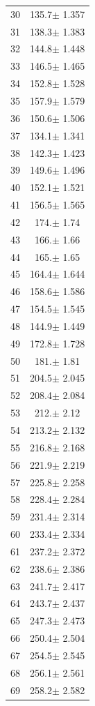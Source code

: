 \documentclass[a4paper]{instrumentacao}
\begin{document}
\begin{longtable}{cc}
 30 & 135.7$\pm$ 1.357 \\
 31 & 138.3$\pm$ 1.383 \\
 32 & 144.8$\pm$ 1.448 \\
 33 & 146.5$\pm$ 1.465 \\
 34 & 152.8$\pm$ 1.528 \\
 35 & 157.9$\pm$ 1.579 \\
 36 & 150.6$\pm$ 1.506 \\
 37 & 134.1$\pm$ 1.341 \\
 38 & 142.3$\pm$ 1.423 \\
 39 & 149.6$\pm$ 1.496 \\
 40 & 152.1$\pm$ 1.521 \\
 41 & 156.5$\pm$ 1.565 \\
 42 & 174.$\pm$ 1.74 \\
 43 & 166.$\pm$ 1.66 \\
 44 & 165.$\pm$ 1.65 \\
 45 & 164.4$\pm$ 1.644 \\
 46 & 158.6$\pm$ 1.586 \\
 47 & 154.5$\pm$ 1.545 \\
 48 & 144.9$\pm$ 1.449 \\
 49 & 172.8$\pm$ 1.728 \\
 50 & 181.$\pm$ 1.81 \\
 51 & 204.5$\pm$ 2.045 \\
 52 & 208.4$\pm$ 2.084 \\
 53 & 212.$\pm$ 2.12 \\
 54 & 213.2$\pm$ 2.132 \\
 55 & 216.8$\pm$ 2.168 \\
 56 & 221.9$\pm$ 2.219 \\
 57 & 225.8$\pm$ 2.258 \\
 58 & 228.4$\pm$ 2.284 \\
 59 & 231.4$\pm$ 2.314 \\
 60 & 233.4$\pm$ 2.334 \\
 61 & 237.2$\pm$ 2.372 \\
 62 & 238.6$\pm$ 2.386 \\
 63 & 241.7$\pm$ 2.417 \\
 64 & 243.7$\pm$ 2.437 \\
 65 & 247.3$\pm$ 2.473 \\
 66 & 250.4$\pm$ 2.504 \\
 67 & 254.5$\pm$ 2.545 \\
 68 & 256.1$\pm$ 2.561 \\
 69 & 258.2$\pm$ 2.582 \\

\end{longtable}
\end{document}
